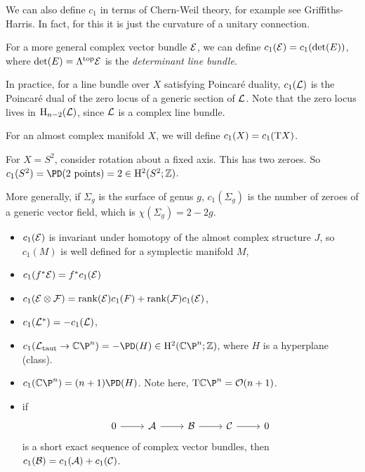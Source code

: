 \documentclass{article}
\begin{document}
We can also define \(c_1\) in terms of Chern-Weil theory, for example see Griffiths-Harris. In fact, for this it is just the curvature of a unitary connection.

For a more general complex vector bundle \(\mathcal{E}\), we can define \(c_1(\mathcal{E}) = c_1(\det(E))\), where \(\det(E) = \Lambda^{\text{top}}\mathcal{E}\) is the \emph{determinant line bundle}.

In practice, for a line bundle over \(X\) satisfying Poincar\'e duality, \(c_1(\mathcal{L})\) is the Poincar\'e dual of the zero locus of a generic section of \(\mathcal{L}\). Note that the zero locus lives in \(\mathrm{H}_{n-2}(\mathcal{L})\), since \(\mathcal{L}\) is a complex line bundle.

For an almost complex manifold \(X\), we will define \(c_1(X) = c_1(\mathrm{T} X)\).

\begin{example}
    For \(X = S^2\), consider rotation about a fixed axis. This has two zeroes. So \(c_1(S^2) = \PD(\text{2 points}) = 2 \in \HH^2(S^2; \Z)\).

    More generally, if \(\Sigma_g\) is the surface of genus \(g\), \(c_1(\Sigma_g)\) is the number of zeroes of a generic vector field, which is \(\chi(\Sigma_g) = 2 - 2g\).
\end{example}

\begin{itemize}
    \item \(c_1(\mathcal{E})\) is invariant under homotopy of the almost complex structure \(J\), so \(c_1(M)\) is well defined for a symplectic manifold \(M\),
    \item \(c_1(f^*\mathcal{E}) = f^*c_1(\mathcal{E})\)
    \item \(c_1(\mathcal{E} \otimes \mathcal{F}) = \rank(\mathcal{E})c_1(F) + \rank(\mathcal{F})c_1(\mathcal{E})\),
    \item \(c_1(\mathcal{L}^*) = -c_1(\mathcal{L})\),
    \item \(c_1(\mcL_{\text{taut}} \to \C\P^n) = -\PD(H) \in \HH^2(\C\P^n; \Z)\), where \(H\) is a hyperplane (class).
    \item \(c_1(\C\P^n) = (n + 1)\PD(H)\). Note here, \(\T\C\P^n = \mcO(n+1)\).
    \item if
\[\begin{tikzcd}
	0 & \mcA & \mcB & \mcC & 0
	\arrow[from=1-1, to=1-2]
	\arrow[from=1-2, to=1-3]
	\arrow[from=1-3, to=1-4]
	\arrow[from=1-4, to=1-5]
\end{tikzcd}\]
    is a short exact sequence of complex vector bundles, then \(c_1(\mathcal{B}) = c_1(\mathcal{A}) + c_1(\mathcal{C})\).
\end{itemize}
\end{document}
